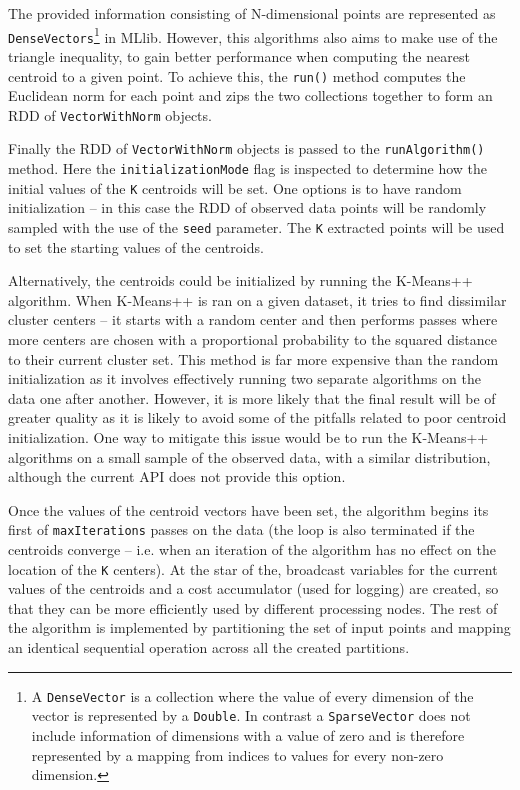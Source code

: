 \documentclass{l4proj}
\begin{document}
The provided information consisting of N-dimensional points are represented as \texttt{DenseVectors}\footnote{A \texttt{DenseVector} is a collection where the value of every dimension of the vector is represented by a \texttt{Double}. In contrast a \texttt{SparseVector} does not include information of dimensions with a value of zero and is therefore represented by a mapping from indices to values for every non-zero dimension.} in MLlib. However, this algorithms also aims to make use of the triangle inequality, to gain better performance when computing the nearest centroid to a given point\cite{Triangle}. To achieve this, the \texttt{run()} method computes the Euclidean norm for each point and zips the two collections together to form an RDD of \texttt{VectorWithNorm} objects.

Finally the RDD of \texttt{VectorWithNorm} objects is passed to the \texttt{runAlgorithm()} method. Here the \texttt{initializationMode} flag is inspected to determine how the initial values of the \texttt{K} centroids will be set. One options is to have random initialization -- in this case the RDD of observed data points will be randomly sampled with the use of the \texttt{seed} parameter. The \texttt{K} extracted points will be used to set the starting values of the centroids. 

Alternatively, the centroids could be initialized by running the K-Means++ algorithm\cite{PlusPlus}. When K-Means++ is ran on a given dataset, it tries to find dissimilar cluster centers -- it starts with a random center and then performs passes where more centers are chosen with a proportional probability to the squared distance to their current cluster set. This method is far more expensive than the random initialization as it involves effectively running two separate algorithms on the data one after another. However, it is more likely that the final result will be of greater quality as it is likely to avoid some of the pitfalls related to poor centroid initialization. One way to mitigate this issue would be to run the K-Means++ algorithms on a small sample of the observed data, with a similar distribution, although the current API does not provide this option.

Once the values of the centroid vectors have been set, the algorithm begins its first of \texttt{maxIterations} passes on the data (the loop is also terminated if the centroids converge -- i.e. when an iteration of the algorithm has no effect on the location of the \texttt{K} centers). At the star of the, broadcast variables for the current values of the centroids and a cost accumulator (used for logging) are created, so that they can be more efficiently used by different processing nodes. The rest of the algorithm is implemented by partitioning the set of input points and mapping an identical sequential operation across all the created partitions. 
\end{document}
